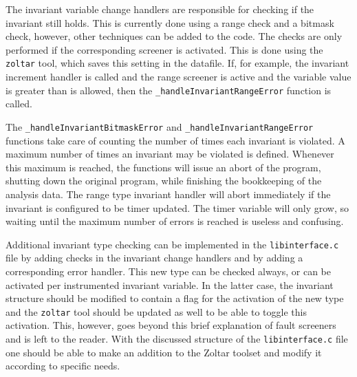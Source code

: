 The invariant variable change handlers are responsible for checking 
if the invariant still holds.
This is currently done using a range check and a bitmask check,
however, other techniques can be added to the code.
The checks are only performed if the corresponding screener is activated.
This is done using the \texttt{zoltar} tool, which saves this setting in the datafile.
If, for example, the invariant increment handler is called 
and the range screener is active and the variable value is greater than is allowed,
then the \texttt{\_handleInvariantRangeError} function is called.

The \texttt{\_handleInvariantBitmaskError} and \texttt{\_handleInvariantRangeError}
functions take care of counting the number of times each invariant is violated.
A maximum number of times an invariant may be violated is defined.
Whenever this maximum is reached, the functions will issue an abort of the program,
shutting down the original program, while finishing the bookkeeping of the analysis data.
The range type invariant handler will abort immediately if the invariant is configured 
to be timer updated.
The timer variable will only grow, so waiting until the maximum number of errors is reached
is useless and confusing.

Additional invariant type checking can be implemented in the \texttt{libinterface.c} file
by adding checks in the invariant change handlers and by adding a corresponding error handler.
This new type can be checked always, or can be activated per instrumented invariant variable.
In the latter case, the invariant structure should be modified to contain a flag for the activation
of the new type and the \texttt{zoltar} tool should be updated as well to be able to toggle this activation.
This, however, goes beyond this brief explanation of fault screeners and is left to the reader.
With the discussed structure of the \texttt{libinterface.c} file one should be able
to make an addition to the Zoltar toolset and modify it according to specific needs.

